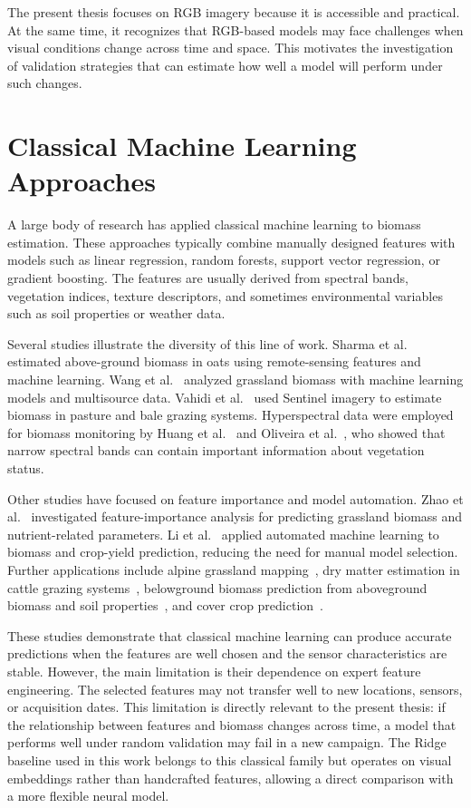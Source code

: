 The present thesis focuses on RGB imagery because it is accessible and practical. At the same time, it recognizes that RGB-based models may face challenges when visual conditions change across time and space. This motivates the investigation of validation strategies that can estimate how well a model will perform under such changes.

\section{Classical Machine Learning Approaches}

A large body of research has applied classical machine learning to biomass estimation. These approaches typically combine manually designed features with models such as linear regression, random forests, support vector regression, or gradient boosting. The features are usually derived from spectral bands, vegetation indices, texture descriptors, and sometimes environmental variables such as soil properties or weather data.

Several studies illustrate the diversity of this line of work. Sharma et al.~\cite{sharma2022oats} estimated above-ground biomass in oats using remote-sensing features and machine learning. Wang et al.~\cite{wang2022grassland} analyzed grassland biomass with machine learning models and multisource data. Vahidi et al.~\cite{vahidi2023sentinel} used Sentinel imagery to estimate biomass in pasture and bale grazing systems. Hyperspectral data were employed for biomass monitoring by Huang et al.~\cite{huang2022hyperspectral} and Oliveira et al.~\cite{oliveira2023hyperspectral}, who showed that narrow spectral bands can contain important information about vegetation status.

Other studies have focused on feature importance and model automation. Zhao et al.~\cite{zhao2024feature} investigated feature-importance analysis for predicting grassland biomass and nutrient-related parameters. Li et al.~\cite{li2022automl} applied automated machine learning to biomass and crop-yield prediction, reducing the need for manual model selection. Further applications include alpine grassland mapping~\cite{shi2023alpine}, dry matter estimation in cattle grazing systems~\cite{defalque2024drymatter}, belowground biomass prediction from aboveground biomass and soil properties~\cite{zhao2025belowground}, and cover crop prediction~\cite{poudel2025cover}.

These studies demonstrate that classical machine learning can produce accurate predictions when the features are well chosen and the sensor characteristics are stable. However, the main limitation is their dependence on expert feature engineering. The selected features may not transfer well to new locations, sensors, or acquisition dates. This limitation is directly relevant to the present thesis: if the relationship between features and biomass changes across time, a model that performs well under random validation may fail in a new campaign. The Ridge baseline used in this work belongs to this classical family but operates on visual embeddings rather than handcrafted features, allowing a direct comparison with a more flexible neural model.

